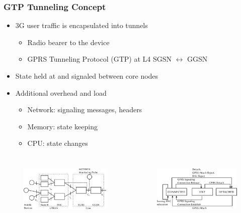 \documentclass{beamer}
\begin{document}
\begin{frame}
    \frametitle{GTP Tunneling Concept}

    \begin{itemize}
		\item 3G user traffic is encapsulated into tunnels
		\begin{itemize}
			\item Radio bearer to the device
			\item GPRS Tunneling Protocol (GTP) at L4 SGSN $\leftrightarrow$ GGSN
		\end{itemize}
		\item State held at and signaled between core nodes
		\item Additional overhead and load
		\begin{itemize}
			\item Network: signaling messages, headers
			\item Memory: state keeping
			\item CPU: state changes
		\end{itemize}
	\end{itemize}

	\begin{columns}
			\vspace{-0.6cm}
			\begin{figure}	
				\includegraphics[height=2.8cm]{../../chapters/04-mobilenets/images/umts-network.pdf}
			\end{figure}

			\vspace{-0.6cm}
			\begin{figure}
				\includegraphics[height=2.8cm]{../../chapters/04-mobilenets/images/mm-3g-state-model.pdf}
			\end{figure}
	\end{columns}
\end{frame}
\end{document}
